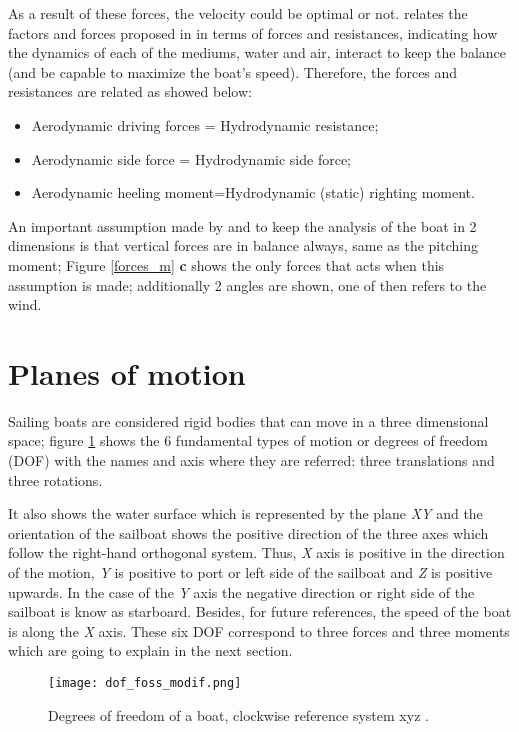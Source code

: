As a result of these forces, the velocity could be optimal or not. \cite{larsonprinciples} relates the factors and forces proposed in\cite{philpott1993yacht} in terms of forces and resistances, indicating how the dynamics of each of the mediums, water and air, interact to keep the balance (and be capable to maximize the boat's speed). Therefore, the forces and resistances are related as showed below: \par 
\begin{itemize}  \label{milgramforces}
 \setlength \itemsep{0em}
\item Aerodynamic driving forces = Hydrodynamic resistance;
\item Aerodynamic side force = Hydrodynamic side force;
\item Aerodynamic heeling moment=Hydrodynamic (static) righting moment.
\end{itemize}
An important assumption made by  \cite{philpott1993yacht} and \cite{larsonprinciples} to keep the analysis of the boat in 2 dimensions is that vertical forces are in balance always, same as the pitching moment; Figure \ref{forces_m} \textbf{c} shows the only forces that acts when this assumption is made; additionally 2 angles are shown, one of then refers to the wind.\par

\section{Planes of motion}
Sailing boats are considered rigid bodies that can move in a three dimensional space; figure \ref{DOF} shows the 6 fundamental types of motion or degrees of freedom (DOF)  with the names and axis where they are referred: three translations and three rotations. \par 
It also shows the water surface which is represented by the plane \textit{XY} and the orientation of the sailboat shows the positive direction of the three axes which follow the right-hand orthogonal system. Thus, \textit{X} axis is positive in the direction of the motion, \textit{Y} is positive to port or left side of the sailboat and \textit{Z} is positive upwards. In the case of the \textit{Y} axis the negative direction or right side of the sailboat is know as starboard.  Besides, for future references, the speed of the boat is along the \textit{X} axis. These six DOF correspond to three forces and three moments which are going to explain in the next section. \par 
\begin{figure} %
\centering
  \texttt{[image: dof\_foss\_modif.png]}
 \caption{Degrees of freedom of a boat, clockwise reference system xyz \cite{fossati2009aero}. }
\label{DOF}
\end{figure}

